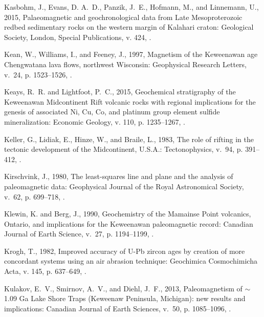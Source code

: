 \documentclass[11pt,letterpaper]{article}
\begin{document}
\begin{thebibliography}{153}
Kasbohm, J., Evans, D. A.~D., Panzik, J.~E., Hofmann, M., and Linnemann, U.,
  2015, {Palaeomagnetic and geochronological data from Late Mesoproterozoic
  redbed sedimentary rocks on the western margin of Kalahari craton}:
  Geological Society, London, Special Publications, v. 424,
  .

Kean, W., Williams, I., and Feeney, J., 1997, Magnetism of the {K}eweenawan age
  {C}hengwatana lava flows, northwest {W}isconsin: Geophysical Research
  Letters, v.~24, p. 1523--1526, .

Keays, R.~R. and Lightfoot, P.~C., 2015, Geochemical stratigraphy of the
  {Keweenawan Midcontinent Rift} volcanic rocks with regional implications for
  the genesis of associated {Ni, Cu, Co}, and platinum group element sulfide
  mineralization: Economic Geology, v. 110, p. 1235--1267,
  .

Keller, G., Lidiak, E., Hinze, W., and Braile, L., 1983, The role of rifting in
  the tectonic development of the {M}idcontinent, {U}.{S}.{A}.: Tectonophysics,
  v.~94, p. 391--412, .

Kirschvink, J., 1980, The least-squares line and plane and the analysis of
  paleomagnetic data: Geophysical Journal of the Royal Astronomical Society,
  v.~62, p. 699--718, .

Klewin, K. and Berg, J., 1990, Geochemistry of the {M}amainse {P}oint
  volcanics, {O}ntario, and implications for the {K}eweenawan paleomagnetic
  record: Canadian Journal of Earth Science, v.~27, p. 1194--1199,
  .

Krogh, T., 1982, Improved accuracy of {U}-{P}b zircon ages by creation of more
  concordant systems using an air abrasion technique: Geochimica Cosmochimicha
  Acta, v. 145, p. 637--649, .

Kulakov, E.~V., Smirnov, A.~V., and Diehl, J.~F., 2013, {Paleomagnetism of
  $\sim$1.09 Ga Lake Shore Traps (Keweenaw Peninsula, Michigan): new results
  and implications}: Canadian Journal of Earth Sciences, v.~50, p. 1085--1096,
  .


\end{thebibliography}
\end{document}
